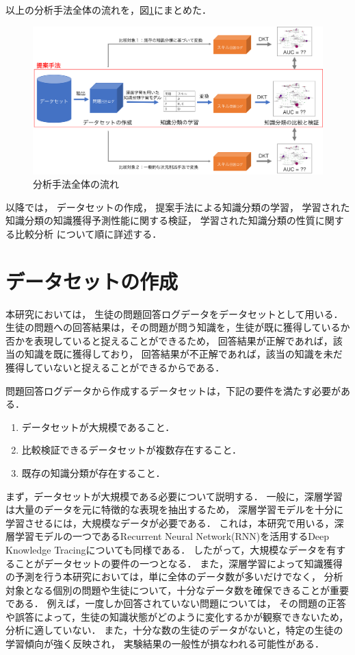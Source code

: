 以上の分析手法全体の流れを，図\ref{fig:workflow}にまとめた．
\begin{figure}[htb]
\begin{center}
\includegraphics[width=400pt]{./img/workflow.png}
\end{center}
\caption{分析手法全体の流れ}
\label{fig:workflow}
\end{figure}

以降では，
データセットの作成，
提案手法による知識分類の学習，
学習された知識分類の知識獲得予測性能に関する検証，
学習された知識分類の性質に関する比較分析
について順に詳述する．


\section{データセットの作成}
本研究においては，
生徒の問題回答ログデータをデータセットとして用いる．
生徒の問題への回答結果は，その問題が問う知識を，生徒が既に獲得しているか否かを表現していると捉えることができるため，
回答結果が正解であれば，該当の知識を既に獲得しており，
回答結果が不正解であれば，該当の知識を未だ獲得していないと捉えることができるからである．

問題回答ログデータから作成するデータセットは，下記の要件を満たす必要がある．
\begin{enumerate}
	\item データセットが大規模であること．
	\item 比較検証できるデータセットが複数存在すること．
	\item 既存の知識分類が存在すること．
\end{enumerate}


まず，データセットが大規模である必要について説明する．
一般に，深層学習は大量のデータを元に特徴的な表現を抽出するため，
深層学習モデルを十分に学習させるには，大規模なデータが必要である．
これは，本研究で用いる，深層学習モデルの一つであるRecurrent Neural Network(RNN)を活用するDeep Knowledge Tracingについても同様である\cite{piech2015deep}．
したがって，大規模なデータを有することがデータセットの要件の一つとなる．
また，深層学習によって知識獲得の予測を行う本研究においては，単に全体のデータ数が多いだけでなく，
分析対象となる個別の問題や生徒について，十分なデータ数を確保できることが重要である．
例えば，一度しか回答されていない問題については，
その問題の正答や誤答によって，生徒の知識状態がどのように変化するかが観察できないため，分析に適していない．
また，十分な数の生徒のデータがないと，特定の生徒の学習傾向が強く反映され，
実験結果の一般性が損なわれる可能性がある．


